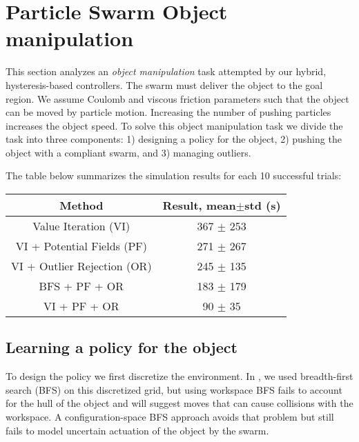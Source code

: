 
\section{Particle Swarm Object manipulation}\label{sec:exp}

This section analyzes an \emph{object manipulation} task attempted by our hybrid, hysteresis-based controllers. The swarm must deliver the object to the goal region. 
We assume Coulomb and viscous friction parameters such that the object can be moved by particle motion.  Increasing the number of pushing particles increases the object speed.
 To solve this object manipulation task we divide the task into three components: 1) designing a policy for the object, 2) pushing the object with a compliant swarm, and 3) managing outliers.

The table below summarizes the simulation results for each 10 successful trials:
\begin{center}
\begin{tabular}{ c c }
\hline
Method & Result, mean$\pm$std (s)\\ [0.5ex] 
\hline \hline
Value Iteration (VI) & 367 $\pm$ 253 \\ 
\hline
VI + Potential Fields (PF) & 271 $\pm$ 267 \\  
\hline
VI + Outlier Rejection (OR) & 245 $\pm$ 135\\
\hline
BFS + PF + OR & 183 $\pm$ 179 \\
\hline
VI + PF + OR & 90 $\pm$ 35 \\[0.5ex]
\hline
\end{tabular}
\end{center}
\subsection{Learning a policy for the object}\label{subsec:objectpolicy}

To design the policy we first discretize the environment. 
In \cite{ShahrokhiIROS2015}, we used breadth-first search (BFS) on this discretized grid, but using workspace BFS fails to account for the hull of the object and will suggest moves that can cause collisions with the workspace. A configuration-space BFS approach avoids that problem but still fails to model uncertain actuation of the object by the swarm.

